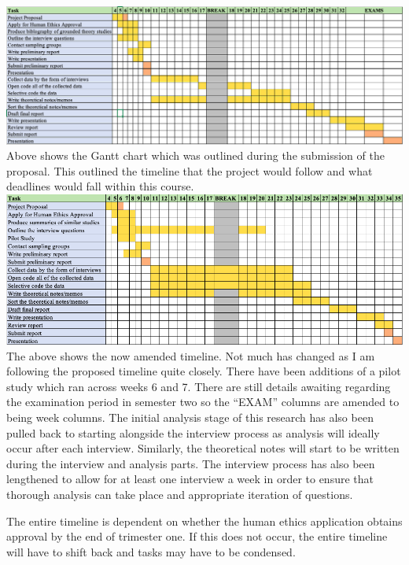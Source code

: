 \includegraphics[width=\textwidth]{figures/fig1.png}
\newline
\newline
Above shows the Gantt chart which was outlined during the submission of the proposal. This outlined the timeline that the project would follow and what deadlines would fall within this course. 
\newline
\newline
\includegraphics[width=\textwidth]{figures/fig2.png}
\newline
\newline
The above shows the now amended timeline. Not much has changed as I am following the proposed timeline quite closely. There have been additions of a pilot study which ran across weeks 6 and 7. There are still details awaiting regarding the examination period in semester two so the “EXAM” columns are amended to being week columns. The initial analysis stage of this research has also been pulled back to starting alongside the interview process as analysis will ideally occur after each interview. Similarly, the theoretical notes will start to be written during the interview and analysis parts. The interview process has also been lengthened to allow for at least one interview a week in order to ensure that thorough analysis can take place and appropriate iteration of questions.
\newline
\par The entire timeline is dependent on whether the human ethics application obtains approval by the end of trimester one.  If this does not occur, the entire timeline will have to shift back and tasks may have to be condensed.






